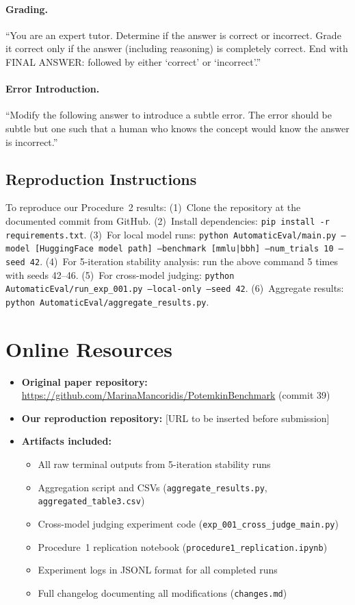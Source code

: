\documentclass[sigconf,authordraft]{acmart}
\begin{document}
\paragraph{Grading.} ``You are an expert tutor. Determine if the answer is correct or incorrect. Grade it correct only if the answer (including reasoning) is completely correct. End with FINAL ANSWER: followed by either `correct' or `incorrect'.''

\paragraph{Error Introduction.} ``Modify the following answer to introduce a subtle error. The error should be subtle but one such that a human who knows the concept would know the answer is incorrect.''

\subsection{Reproduction Instructions}

To reproduce our Procedure~2 results: (1)~Clone the repository at the documented commit from GitHub. (2)~Install dependencies: \texttt{pip install -r requirements.txt}. (3)~For local model runs: \texttt{python AutomaticEval/main.py --model [HuggingFace model path] --benchmark [mmlu|bbh] --num\_trials 10 --seed 42}. (4)~For 5-iteration stability analysis: run the above command 5 times with seeds 42--46. (5)~For cross-model judging: \texttt{python AutomaticEval/run\_exp\_001.py --local-only --seed 42}. (6)~Aggregate results: \texttt{python AutomaticEval/aggregate\_results.py}.

\section{Online Resources}

\begin{itemize}
    \item \textbf{Original paper repository:} \url{https://github.com/MarinaMancoridis/PotemkinBenchmark} (commit 39)
    \item \textbf{Our reproduction repository:} [URL to be inserted before submission]
    \item \textbf{Artifacts included:}
    \begin{itemize}
        \item All raw terminal outputs from 5-iteration stability runs
        \item Aggregation script and CSVs (\texttt{aggregate\_results.py}, \texttt{aggregated\_table3.csv})
        \item Cross-model judging experiment code (\texttt{exp\_001\_cross\_judge\_main.py})
        \item Procedure~1 replication notebook (\texttt{procedure1\_replication.ipynb})
        \item Experiment logs in JSONL format for all completed runs
        \item Full changelog documenting all modifications (\texttt{changes.md})
    \end{itemize}
\end{itemize}
\end{document}
